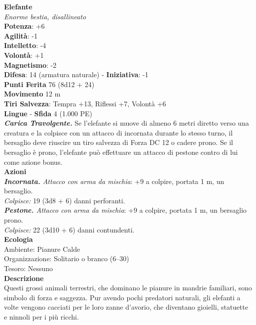 \begin{multicols}{2}
\medskip\textbf{Elefante}\\
\emph{Enorme bestia, disallineato}\\
\textbf{Potenza}: +6\\
\textbf{Agilità}: -1\\
\textbf{Intelletto}: -4\\
\textbf{Volontà}: +1\\
\textbf{Magnetismo}: -2\\
\textbf{Difesa}: 14 (armatura naturale) - \textbf{Iniziativa}: -1\\
\textbf{Punti Ferita} 76 (8d12 + 24)\\
\textbf{Movimento} 12 m\\
\textbf{Tiri Salvezza}: Tempra +13, Riflessi +7, Volontà +6 \\
\textbf{Lingue} -
\textbf{Sfida} 4 (1.000 PE)\smallskip\\
\emph{\textbf{Carica Travolgente.}} Se l'elefante si muove di almeno 6 metri diretto verso una creatura e la colpisce con un attacco di incornata durante lo stesso turno, il bersaglio deve riuscire un tiro salvezza di Forza DC 12 o cadere prono. Se il bersaglio è prono, l'elefante può effettuare un attacco di pestone contro di lui come azione bonus.\\
\smallskip\textbf{Azioni}\\
\emph{\textbf{Incornata.} Attacco con arma da mischia}: +9 a colpire, portata 1 m, un bersaglio.\\
\emph{Colpisce:} 19 (3d8 + 6) danni perforanti.\\
\emph{\textbf{Pestone.} Attacco con arma da mischia}: +9 a colpire, portata 1 m, un bersaglio prono.\\
\emph{Colpisce:} 22 (3d10 + 6) danni contundenti.\\
\textbf{Ecologia}\\
Ambiente: Pianure Calde\\
Organizzazione: Solitario o branco (6–30)\\
Tesoro: Nessuno\\
\textbf{Descrizione}\\

Questi grossi animali terrestri, che dominano le pianure in mandrie familiari, sono simbolo di forza e saggezza. Pur avendo pochi predatori naturali, gli elefanti a volte vengono cacciati per le loro zanne d’avorio, che diventano gioielli, statuette e ninnoli per i più ricchi. \\


\end{multicols}
